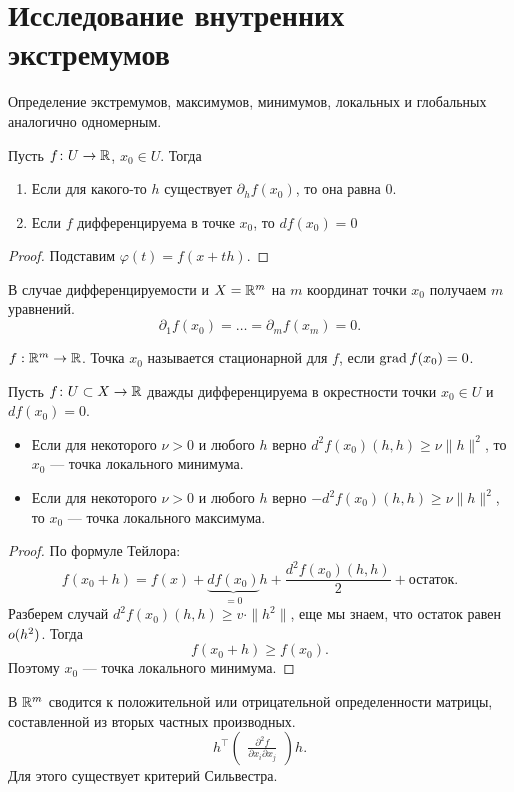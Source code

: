 \section{Исследование внутренних экстремумов}
\begin{defn}
    Определение экстремумов, максимумов, минимумов, локальных и глобальных аналогично одномерным.
\end{defn}

\begin{thm}
    Пусть $ f\colon U \to  \mathbb{R}$, $ x_0 \in U$. Тогда
    \begin{enumerate}[noitemsep]
	\item Если для какого-то $ h$ существует  $ \partial _h f(x_0)$, то она равна 0.
	\item Если $ f$ дифференцируема в точке  $ x_0$, то $ df(x_0) = 0$
    \end{enumerate}
\end{thm}
\begin{proof}
	Подставим $ \varphi (t) = f(x+th)$.
\end{proof}
\begin{note}
    В случае дифференцируемости и $ X = \mathbb{R}^{m}$ на $ m$ координат точки  $ x_0$ получаем $ m$ уравнений.
    \[
	\partial _1 f(x_0) = \ldots = \partial _m f(x_m) = 0
    .\] 
\end{note}
\begin{defn}
    $ f: \mathbb{R}^{m } \to  \mathbb{R}$.
    Точка $ x_0$ называется {\sf   стационарной} для $ f$, если  $ \operatorname{grad} f(x_0) = 0$.
\end{defn}
\begin{thm}
    Пусть $ f\colon U \subset X \to  \mathbb{R}$ дважды дифференцируема в окрестности точки $ x_0 \in  U$ и $ df(x_0) = 0$.
    \begin{itemize}[noitemsep]
	\item Если для некоторого $ \nu >0 $ и любого  $ h$ верно $ d^2f(x_0) (h, h) \ge  \nu \| h \|^2 $, то $ x_0$ --- точка локального минимума.
	\item Если для некоторого $ \nu >0 $ и любого  $ h$ верно $ -d^2f(x_0) (h, h) \ge  \nu \| h \|^2 $, то $ x_0$ --- точка локального максимума.
    \end{itemize}
\end{thm}

\begin{proof}
    По формуле Тейлора:
	\[
		f(x_0 + h) = f(x) + \underbrace{df(x_0)}_{=0}h + \frac{d^2f(x_0)(h, h)}{2} + \text{остаток}
	.\] 
	Разберем случай $ d^2f(x_0) (h, h) \ge v \cdot \| h^2 \| $, еще мы знаем, что остаток равен  $ o(h^2)$. Тогда 
	\[
		f(x_0+h) \ge f(x_0)
	.\] 
	Поэтому $ x_0$ --- точка локального минимума.
\end{proof}
\begin{note}
    В $ \mathbb{R}^{m}$ сводится к положительной или отрицательной определенности матрицы, составленной из вторых частных производных. 
    \[
    h^{\top} 
    \begin{pmatrix}
    \frac{\partial ^2f}{\partial x_i \partial x_j} 
    \end{pmatrix}
    h
    .\] 
    Для этого существует критерий Сильвестра.
\end{note}
% 

